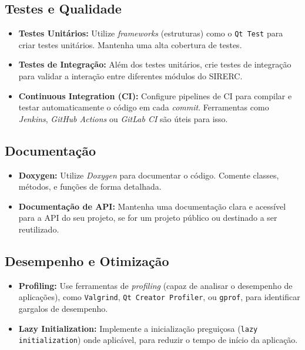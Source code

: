 \documentclass[a4paper,11pt]{article}
\newcommand{\sistema}{\textsf{SIRERC}}
\begin{document}
\subsection{Testes e Qualidade}
\begin{itemize}
	\item \textbf{Testes Unitários:} Utilize \textit{frameworks} (estruturas) como o \texttt{Qt Test} para criar testes unitários. Mantenha uma alta cobertura de testes.
	
	\item \textbf{Testes de Integração:} Além dos testes unitários, crie testes de integração para validar a interação entre diferentes módulos do \sistema{}.
	
	\item \textbf{Continuous Integration (CI):} Configure pipelines de CI para compilar e testar automaticamente o código em cada \textit{commit}. Ferramentas como \textit{Jenkins}, \textit{GitHub Actions} ou \textit{GitLab CI} são úteis para isso.
	
\end{itemize}

\subsection{Documentação}
\begin{itemize}
	\item \textbf{Doxygen:} Utilize \textit{Doxygen} para documentar o código. Comente classes, métodos, e funções de forma detalhada.
	
	\item \textbf{Documentação de API:} Mantenha uma documentação clara e acessível para a API do seu projeto, se for um projeto público ou destinado a ser reutilizado.
\end{itemize}

\subsection{Desempenho e Otimização}
\begin{itemize}
	\item \textbf{Profiling:} Use ferramentas de \textit{profiling} (capaz de analisar o desempenho de aplicações), como \texttt{Valgrind}, \texttt{Qt Creator Profiler}, ou \texttt{gprof}, para identificar gargalos de desempenho.
	
	\item \textbf{Lazy Initialization:} Implemente a inicialização preguiçosa (\texttt{lazy initialization}) onde aplicável, para reduzir o tempo de início da aplicação.
\end{itemize}
\end{document}
